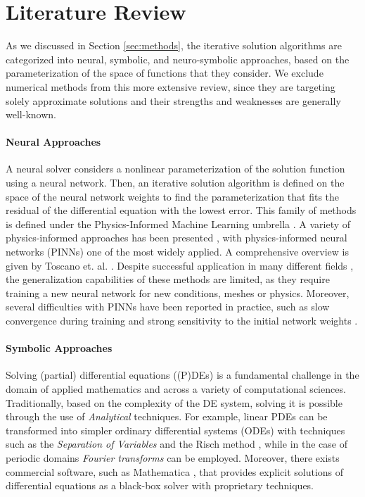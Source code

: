 \section{Literature Review}
\label{sm:literature review}
As we discussed in Section \ref{sec:methods}, the iterative solution algorithms are categorized into neural, symbolic, and neuro-symbolic approaches, based on the parameterization of the space of functions that they consider. 
We exclude numerical methods from this more extensive review, since they are targeting solely approximate solutions and their strengths and weaknesses are generally well-known.

\paragraph{Neural Approaches} A neural solver considers a nonlinear parameterization of the solution function using a neural network. Then, an iterative solution algorithm is defined on the space of the neural network weights to find the parameterization that fits the residual of the differential equation with the lowest error. This family of methods is defined under the Physics-Informed Machine Learning umbrella \cite{karniadakis2021physics}. A variety of physics-informed approaches has been presented \cite{sirignano2018dgm, bhatnagar2019prediction, zhu2018bayesian, khoo2021solving}, with physics-informed neural networks (PINNs)  \cite{raissi2018deep, lagaris1998artificial} one of the most widely applied.  A comprehensive overview is given by Toscano et. al. \cite{toscano2024pinns}. Despite successful application in many different fields \cite{kissas2020machine, manav2024phase, cai2021physics, mao2020physics}, the generalization capabilities of these methods are limited, as they require training a new neural network for new conditions, meshes or physics. Moreover, several difficulties with PINNs have been reported in practice, such as slow convergence during training and strong sensitivity to the initial network weights \cite{de2023operator, wang2022and, wang2021understanding}.


\paragraph{Symbolic Approaches} Solving (partial) differential equations ((P)DEs) is a fundamental challenge in the domain of applied mathematics and across a variety of computational sciences. Traditionally, based on the complexity of the DE system, solving it is possible through the use of \textit{Analytical} techniques. For example, linear PDEs can be transformed into simpler ordinary differential systems (ODEs) with techniques such as the \textit{Separation of Variables} \cite{miller1977symmetry} and the Risch method \cite{risch1969the}, while in the case of periodic domains \textit{Fourier transforms} \cite{debnath2006integral, dyke2014an} can be employed. Moreover, there exists commercial software, such as Mathematica \cite{mathematica}, that provides explicit solutions of differential equations as a black-box solver with proprietary techniques. 

